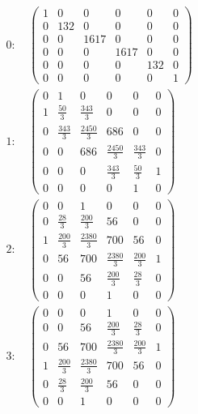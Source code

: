 \documentclass[11pt]{article}
\newcommand{\prompt}[4]{
        {\ttfamily\llap{{\color{#2}[#3]:\hspace{3pt}#4}}\vspace{-\baselineskip}}
    }
\begin{document}
            
\prompt{Out}{outcolor}{18}{}
    {\small
    \begin{math}
\newcommand{\Bold}[1]{\mathbf{#1}}\begin{aligned}0: &\ \left(\begin{array}{rrrrrr}
1 & 0 & 0 & 0 & 0 & 0 \\
0 & 132 & 0 & 0 & 0 & 0 \\
0 & 0 & 1617 & 0 & 0 & 0 \\
0 & 0 & 0 & 1617 & 0 & 0 \\
0 & 0 & 0 & 0 & 132 & 0 \\
0 & 0 & 0 & 0 & 0 & 1
\end{array}\right) \\
1: &\ \left(\begin{array}{rrrrrr}
0 & 1 & 0 & 0 & 0 & 0 \\
1 & \frac{50}{3} & \frac{343}{3} & 0 & 0 & 0 \\
0 & \frac{343}{3} & \frac{2450}{3} & 686 & 0 & 0 \\
0 & 0 & 686 & \frac{2450}{3} & \frac{343}{3} & 0 \\
0 & 0 & 0 & \frac{343}{3} & \frac{50}{3} & 1 \\
0 & 0 & 0 & 0 & 1 & 0
\end{array}\right) \\
2: &\ \left(\begin{array}{rrrrrr}
0 & 0 & 1 & 0 & 0 & 0 \\
0 & \frac{28}{3} & \frac{200}{3} & 56 & 0 & 0 \\
1 & \frac{200}{3} & \frac{2380}{3} & 700 & 56 & 0 \\
0 & 56 & 700 & \frac{2380}{3} & \frac{200}{3} & 1 \\
0 & 0 & 56 & \frac{200}{3} & \frac{28}{3} & 0 \\
0 & 0 & 0 & 1 & 0 & 0
\end{array}\right) \\
3: &\ \left(\begin{array}{rrrrrr}
0 & 0 & 0 & 1 & 0 & 0 \\
0 & 0 & 56 & \frac{200}{3} & \frac{28}{3} & 0 \\
0 & 56 & 700 & \frac{2380}{3} & \frac{200}{3} & 1 \\
1 & \frac{200}{3} & \frac{2380}{3} & 700 & 56 & 0 \\
0 & \frac{28}{3} & \frac{200}{3} & 56 & 0 & 0 \\
0 & 0 & 1 & 0 & 0 & 0
\end{array}\right) \\

\end{aligned}
\end{math}}
\end{document}
